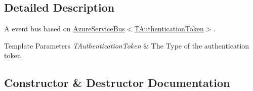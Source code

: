 \subsection{Detailed Description}
A event bus based on \hyperlink{classCqrs_1_1Azure_1_1ServiceBus_1_1AzureServiceBus_a44845c00c29574c2fa2d43a8a6b124ca_a44845c00c29574c2fa2d43a8a6b124ca}{Azure\+Service\+Bus$<$\+T\+Authentication\+Token$>$}. 


\begin{DoxyTemplParams}{Template Parameters}
{\em T\+Authentication\+Token} & The Type of the authentication token.\\
\hline
\end{DoxyTemplParams}


\subsection{Constructor \& Destructor Documentation}
\mbox{\label{classCqrs_1_1Azure_1_1ServiceBus_1_1AzureEventBus_aaaf74d2e4e79924b7231750478508ed6_aaaf74d2e4e79924b7231750478508ed6}} 
